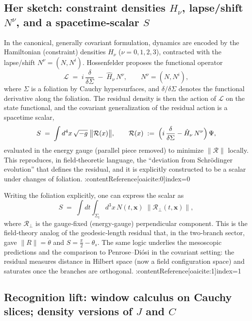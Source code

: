 \documentclass[11pt,letterpaper]{article}
\begin{document}
\subsection{Her sketch: constraint densities \(H_{\nu}\), lapse/shift \(N^{\nu}\), and a spacetime‑scalar \(S\)}

In the canonical, generally covariant formulation, dynamics are encoded by the Hamiltonian (constraint) densities \(H_{\nu}\) (\(\nu=0,1,2,3\)), contracted with the lapse/shift \(N^{\nu}=(N,N^{i})\). Hossenfelder proposes the functional operator
\begin{equation}
\mathcal L \;=\; i\,\frac{\delta}{\delta\Sigma}\;-\;\hat H_{\nu}\,N^{\nu},
\qquad
N^{\nu}=(N, N^{i}),
\end{equation}
where \(\Sigma\) is a foliation by Cauchy hypersurfaces, and \(\delta/\delta\Sigma\) denotes the functional derivative along the foliation. The residual density is then the action of \(\mathcal L\) on the state functional, and the covariant generalization of the residual action is a spacetime scalar,
\begin{equation}
S \;=\; \int d^4x\,\sqrt{-g}\;\bigl\|\mathcal R(x)\bigr\|,
\qquad
\mathcal R(x)\;:=\;\Bigl(i\,\frac{\delta}{\delta\Sigma}-\hat H_{\nu}\,N^{\nu}\Bigr)\,\Psi,
\end{equation}
evaluated in the energy gauge (parallel piece removed) to minimize \(\|\mathcal R\|\) locally. This reproduces, in field‑theoretic language, the ``deviation from Schrödinger evolution'' that defines the residual, and it is explicitly constructed to be a scalar under changes of foliation. :contentReference[oaicite:0]{index=0}

Writing the foliation explicitly, one can express the scalar as
\begin{equation}
S \;=\; \int dt \int_{\Sigma_t} d^3x\,N(t,\mathbf x)\;\bigl\|\mathcal R_{\perp}(t,\mathbf x)\bigr\|,
\end{equation}
where \(\mathcal R_{\perp}\) is the gauge‑fixed (energy‑gauge) perpendicular component. This is the field‑theory analog of the geodesic‑length residual that, in the two‑branch sector, gave \(\|R\|=\dot\theta\) and \(S=\tfrac{\pi}{2}-\theta_s\). The same logic underlies the mesoscopic predictions and the comparison to Penrose–Diósi in the covariant setting: the residual measures distance in Hilbert space (now a field configuration space) and saturates once the branches are orthogonal. :contentReference[oaicite:1]{index=1}

\subsection{Recognition lift: window calculus on Cauchy slices; density versions of \(J\) and \(C\)}
\end{document}
